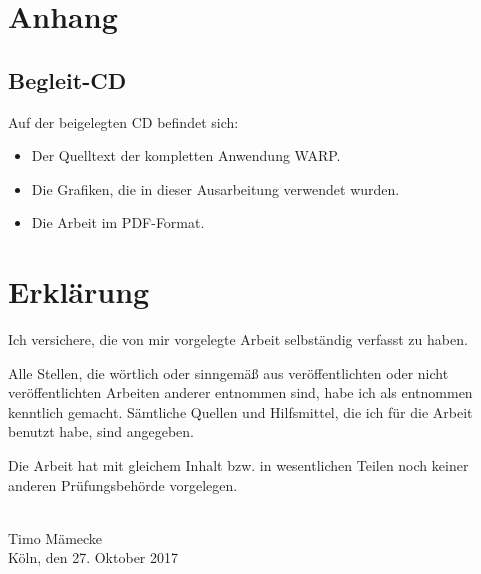 
\chapter{Anhang}

\section{Begleit-CD}

Auf der beigelegten CD befindet sich:

\begin{itemize}
  \item Der Quelltext der kompletten Anwendung WARP.
  \item Die Grafiken, die in dieser Ausarbeitung verwendet wurden.
  \item Die Arbeit im PDF-Format.
\end{itemize}

\chapter*{Erklärung}

Ich versichere, die von mir vorgelegte Arbeit selbständig verfasst zu haben.

Alle Stellen, die wörtlich oder sinngemäß aus veröffentlichten oder nicht veröffentlichten Arbeiten anderer entnommen sind, habe ich als entnommen kenntlich gemacht. Sämtliche Quellen und Hilfsmittel, die ich für die Arbeit benutzt habe, sind angegeben.

Die Arbeit hat mit gleichem Inhalt bzw. in wesentlichen Teilen noch keiner anderen Prüfungsbehörde vorgelegen.

\vspace{3cm}

\makebox[.5\textwidth][r]{\hrulefill} \\
Timo Mämecke \\
Köln, den 27. Oktober 2017
